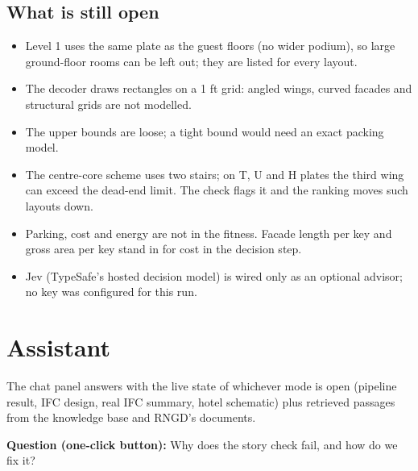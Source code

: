 \documentclass[10pt]{article}
\begin{document}
\subsection{What is still open}
\begin{itemize}
\item Level 1 uses the same plate as the guest floors (no wider podium), so large ground-floor rooms can be left out; they are listed for every layout.
\item The decoder draws rectangles on a 1 ft grid: angled wings, curved facades and structural grids are not modelled.
\item The upper bounds are loose; a tight bound would need an exact packing model.
\item The centre-core scheme uses two stairs; on T, U and H plates the third wing can exceed the dead-end limit. The check flags it and the ranking moves such layouts down.
\item Parking, cost and energy are not in the fitness. Facade length per key and gross area per key stand in for cost in the decision step.
\item Jev (TypeSafe's hosted decision model) is wired only as an optional advisor; no key was configured for this run.
\end{itemize}


\section{Assistant}
The chat panel answers with the live state of whichever mode is open (pipeline result, IFC design, real IFC summary,
hotel schematic) plus retrieved passages from the knowledge base and RNGD's documents.

\textbf{Question (one-click button):} Why does the story check fail, and how do we fix it?
\end{document}
